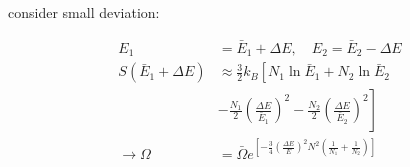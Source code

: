 consider small deviation:

\begin{equation*}
    \begin{aligned}
        E_1 &= \bar{E}_1 + \Delta E, \quad E_2 = \bar{E}_2 - \Delta E \\
        S(\bar{E}_1 + \Delta E) &\approx \frac{3}{2} k_B \left[N_1 \ln \bar{E}_1 + N_2 \ln \bar{E}_2  \right. \\
            &\left. - \frac{N_1}{2} \left(\frac{\Delta E}{\bar{E}_1}\right)^2 - \frac{N_2}{2} \left(\frac{\Delta E}{\bar{E}_2}\right)^2\right] \\
        \rightarrow \Omega &= \bar{\Omega} e^{\left[-\frac{3}{4} \left(\frac{\Delta E}{E}\right)^2 N^2 \left(\frac{1}{N_1}+\frac{1}{N_2}\right)\right]}
    \end{aligned}
\end{equation*}